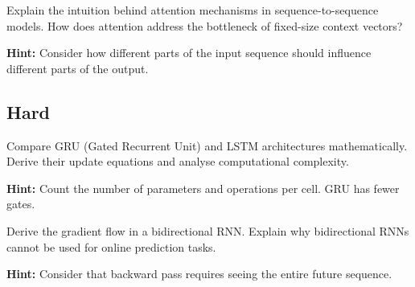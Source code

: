 \begin{problem}
Explain the intuition behind attention mechanisms in sequence-to-sequence models. How does attention address the bottleneck of fixed-size context vectors?

\textbf{Hint:} Consider how different parts of the input sequence should influence different parts of the output.
\end{problem}

\subsection*{Hard}

\begin{problem}
Compare GRU (Gated Recurrent Unit) and LSTM architectures mathematically. Derive their update equations and analyse computational complexity.

\textbf{Hint:} Count the number of parameters and operations per cell. GRU has fewer gates.
\end{problem}

\begin{problem}
Derive the gradient flow in a bidirectional RNN. Explain why bidirectional RNNs cannot be used for online prediction tasks.

\textbf{Hint:} Consider that backward pass requires seeing the entire future sequence.
\end{problem}

